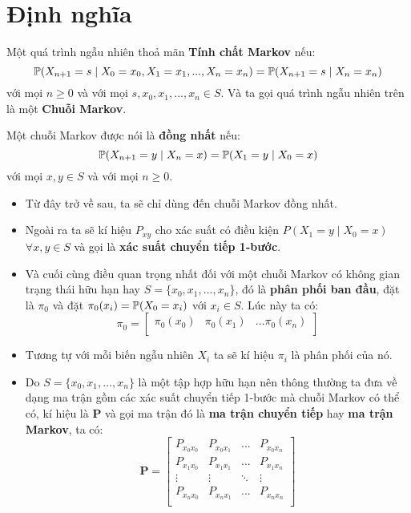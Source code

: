 \section{Định nghĩa}

\begin{defivn} Một quá trình ngẫu nhiên thoả mãn \textbf{Tính chất Markov} nếu:
$$
\P(X_{n + 1} = s \mid X_0 = x_0, X_1 = x_1, ..., X_n = x_n) = \P(X_{n+1} = s \mid X_n = x_n)
$$
với mọi $n \geq 0$ và với mọi $s, x_0, x_1, ..., x_n \in S$. Và ta gọi quá trình ngẫu nhiên trên là một \textbf{Chuỗi Markov}.
\end{defivn}

\begin{defivn}
    Một chuỗi Markov được nói là \textbf{đồng nhất} nếu:
    $$
    \P(X_{n+1} = y \mid X_{n} = x) = \P(X_1 = y \mid X_0 = x)
    $$
    với mọi $x, y \in S$ và với mọi $n \geq 0$.
\end{defivn}

\begin{itemize}
    \item Từ đây trở về sau, ta sẽ chỉ dùng đến chuỗi Markov đồng nhất.
    
    \item Ngoài ra ta sẽ kí hiệu $P_{xy}$ cho xác suất có điều kiện $P(X_1 = y \mid X_0 = x)$ $\forall x,y \in S$ và gọi là \textbf{xác suất chuyển tiếp 1-bước}.
    
    \item Và cuối cùng điều quan trọng nhất đối với một chuỗi Markov có không gian trạng thái hữu hạn hay $S = \{x_0, x_1, ..., x_n \}$, đó là \textbf{phân phối ban đầu}, đặt là $\pi_0$ và đặt $\pi_{0}(x_i) = \P(X_0 = x_i)$ với $x_i \in S$. Lúc này ta có:
    $$
    \pi_0 = \begin{bmatrix}
        \pi_{0}(x_0) & \pi_{0}(x_1) & ... \pi_{0}(x_n) \\
    \end{bmatrix}
    $$

    \item Tương tự với mỗi biến ngẫu nhiên $X_i$ ta sẽ kí hiệu $\pi_i$ là phân phối của nó.

    \item Do $S = \{x_0, x_1, ..., x_n \}$ là một tập hợp hữu hạn nên thông thường ta đưa về dạng ma trận gồm các xác suất chuyển tiếp 1-bước mà chuỗi Markov có thể có, kí hiệu là $\mathbf{P}$ và gọi ma trận đó là \textbf{ma trận chuyển tiếp} hay \textbf{ma trận Markov}, ta có:
    $$
    \mathbf{P} = \begin{bmatrix}
        P_{x_0x_0} & P_{x_0x_1} & ... & P_{x_0x_n} \\
        P_{x_1x_0} & P_{x_1x_1} & ... & P_{x_1x_n} \\
        \vdots & \vdots & \ddots & \vdots \\
        P_{x_nx_0} & P_{x_nx_1} & ... & P_{x_nx_n} \\
    \end{bmatrix}
    $$
\end{itemize}

